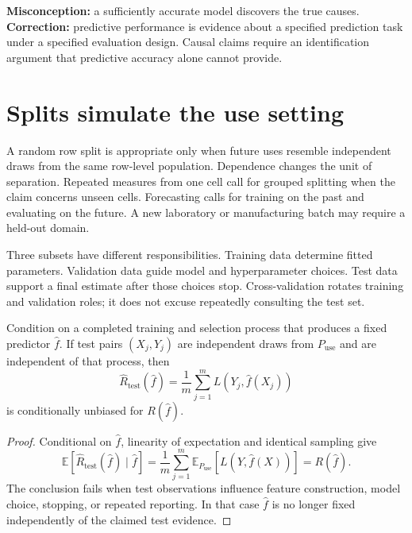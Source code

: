 \begin{misconceptionbox}
\textbf{Misconception:} a sufficiently accurate model discovers the true
causes. \textbf{Correction:} predictive performance is evidence about a
specified prediction task under a specified evaluation design. Causal claims
require an identification argument that predictive accuracy alone cannot
provide.
\end{misconceptionbox}

\section{Splits simulate the use setting}

A random row split is appropriate only when future uses resemble independent
draws from the same row-level population. Dependence changes the unit of
separation. Repeated measures from one cell call for grouped splitting when the
claim concerns unseen cells. Forecasting calls for training on the past and
evaluating on the future. A new laboratory or manufacturing batch may require a
held-out domain.

Three subsets have different responsibilities. Training data determine fitted
parameters. Validation data guide model and hyperparameter choices. Test data
support a final estimate after those choices stop. Cross-validation rotates
training and validation roles; it does not excuse repeatedly consulting the
test set.

\begin{theorem}
\label{thm:test-risk-unbiased}
Condition on a completed training and selection process that produces a fixed
predictor $\widehat f$. If test pairs $(X_j,Y_j)$ are independent draws from
$P_{\mathrm{use}}$ and are independent of that process, then
\[
\widehat R_{\mathrm{test}}(\widehat f)
=\frac1m\sum_{j=1}^{m}L(Y_j,\widehat f(X_j))
\]
is conditionally unbiased for $R(\widehat f)$.
\end{theorem}

\begin{proof}
Conditional on $\widehat f$, linearity of expectation and identical sampling
give
\[
\mathbb{E}[\widehat R_{\mathrm{test}}(\widehat f)\mid\widehat f]
=\frac1m\sum_{j=1}^{m}
\mathbb{E}_{P_{\mathrm{use}}}[L(Y,\widehat f(X))]
=R(\widehat f).
\]
The conclusion fails when test observations influence feature construction,
model choice, stopping, or repeated reporting. In that case $\widehat f$ is no
longer fixed independently of the claimed test evidence.
\end{proof}

